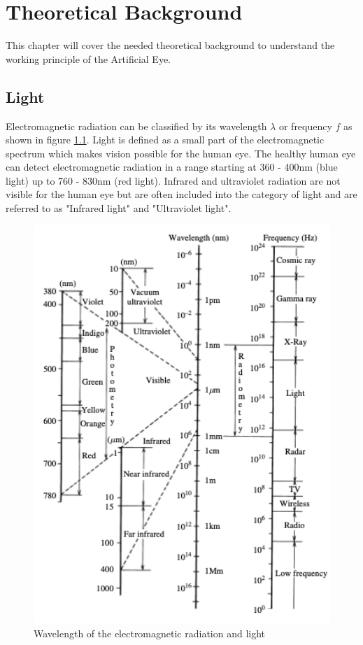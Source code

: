 \chapter{Theoretical Background}
\label{theoretical_background}
This chapter will cover the needed theoretical background to understand the working principle of the Artificial Eye. 

\section{Light}
Electromagnetic radiation can be classified by its wavelength $\lambda$ or frequency $f$ as shown in figure \ref{ElectromagneticSpectrum}. Light is defined as a small part of the electromagnetic spectrum which makes vision possible for the human eye. The healthy human eye can detect electromagnetic radiation in a range starting at 360 - 400nm (blue light) up to 760 - 830nm (red light). Infrared and ultraviolet radiation are not visible for the human eye but are often included into the category of light and are referred to as "Infrared light" and "Ultraviolet light".\cite{NoboruOhta2005}


\begin{figure}
\begin{center}
\includegraphics[width=12cm]{Pictures/ElectromagneticSpectrum}
\caption[Wavelength of the electromagnetic radiation and light]{Wavelength of the electromagnetic radiation and light\cite{NoboruOhta2005}}
\label{ElectromagneticSpectrum}
\end{center}
\end{figure}


